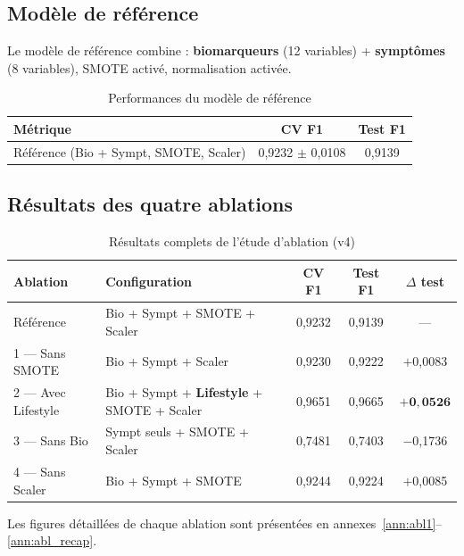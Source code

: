 \documentclass[12pt,a4paper]{article}
\begin{document}
\subsection{Modèle de référence}

Le modèle de référence combine :
\textbf{biomarqueurs} (12 variables) + \textbf{symptômes} (8 variables),
SMOTE activé, normalisation activée.

\begin{table}[H]
\centering
\caption{Performances du modèle de référence}
\label{tab:reference}
\begin{tabular}{lcc}
\toprule
\textbf{Métrique} & \textbf{CV F1} & \textbf{Test F1} \\
\midrule
Référence (Bio + Sympt, SMOTE, Scaler) & 0,9232 $\pm$ 0,0108 & 0,9139 \\
\bottomrule
\end{tabular}
\end{table}

\subsection{Résultats des quatre ablations}

\begin{table}[H]
\centering
\caption{Résultats complets de l'étude d'ablation (v4)}
\label{tab:ablation}
\setlength{\tabcolsep}{4pt}
\begin{tabular}{lp{5.5cm}ccc}
\toprule
\textbf{Ablation} & \textbf{Configuration} & \textbf{CV F1} & \textbf{Test F1}
    & \textbf{$\Delta$ test} \\
\midrule
Référence & Bio + Sympt + SMOTE + Scaler & 0,9232 & 0,9139 & --- \\
\midrule
1 --- Sans SMOTE & Bio + Sympt + Scaler & 0,9230 & 0,9222 & $+$0,0083 \\
\rowcolor{vert!10}
2 --- Avec Lifestyle & Bio + Sympt + \textbf{Lifestyle} + SMOTE + Scaler
    & 0,9651 & 0,9665 & $\mathbf{+0,0526}$ \\
3 --- Sans Bio & Sympt seuls + SMOTE + Scaler & 0,7481 & 0,7403
    & \textcolor{rouge}{$-$0,1736} \\
4 --- Sans Scaler & Bio + Sympt + SMOTE & 0,9244 & 0,9224 & $+$0,0085 \\
\bottomrule
\end{tabular}
\end{table}

Les figures détaillées de chaque ablation sont présentées en
annexes~\ref{ann:abl1}--\ref{ann:abl_recap}.
\end{document}
